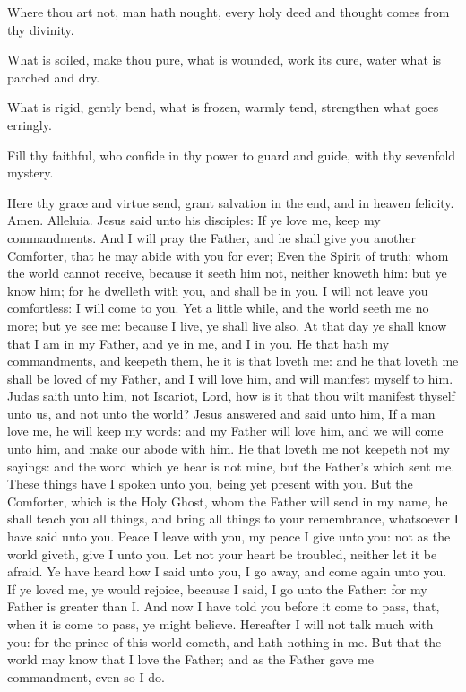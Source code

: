 Where thou art not, man hath nought, every holy deed and thought comes from thy divinity.

What is soiled, make thou pure, what is wounded, work its cure, water what is parched and dry.

What is rigid, gently bend, what is frozen, warmly tend, strengthen what goes erringly.

Fill thy faithful, who confide in thy power to guard and guide, with thy sevenfold mystery.

Here thy grace and virtue send, grant salvation in the end, and in heaven felicity. Amen. Alleluia.
 Jesus said unto his disciples: If ye love me, keep my commandments. And I will pray the Father, and he shall give you another Comforter, that he may abide with you for ever; Even the Spirit of truth; whom the world cannot receive, because it seeth him not, neither knoweth him: but ye know him; for he dwelleth with you, and shall be in you. I will not leave you comfortless: I will come to you. Yet a little while, and the world seeth me no more; but ye see me: because I live, ye shall live also. At that day ye shall know that I am in my Father, and ye in me, and I in you. He that hath my commandments, and keepeth them, he it is that loveth me: and he that loveth me shall be loved of my Father, and I will love him, and will manifest myself to him. Judas saith unto him, not Iscariot, Lord, how is it that thou wilt manifest thyself unto us, and not unto the world? Jesus answered and said unto him, If a man love me, he will keep my words: and my Father will love him, and we will come unto him, and make our abode with him. He that loveth me not keepeth not my sayings: and the word which ye hear is not mine, but the Father's which sent me. These things have I spoken unto you, being yet present with you. But the Comforter, which is the Holy Ghost, whom the Father will send in my name, he shall teach you all things, and bring all things to your remembrance, whatsoever I have said unto you. Peace I leave with you, my peace I give unto you: not as the world giveth, give I unto you. Let not your heart be troubled, neither let it be afraid. Ye have heard how I said unto you, I go away, and come again unto you. If ye loved me, ye would rejoice, because I said, I go unto the Father: for my Father is greater than I. And now I have told you before it come to pass, that, when it is come to pass, ye might believe. Hereafter I will not talk much with you: for the prince of this world cometh, and hath nothing in me. But that the world may know that I love the Father; and as the Father gave me commandment, even so I do.

